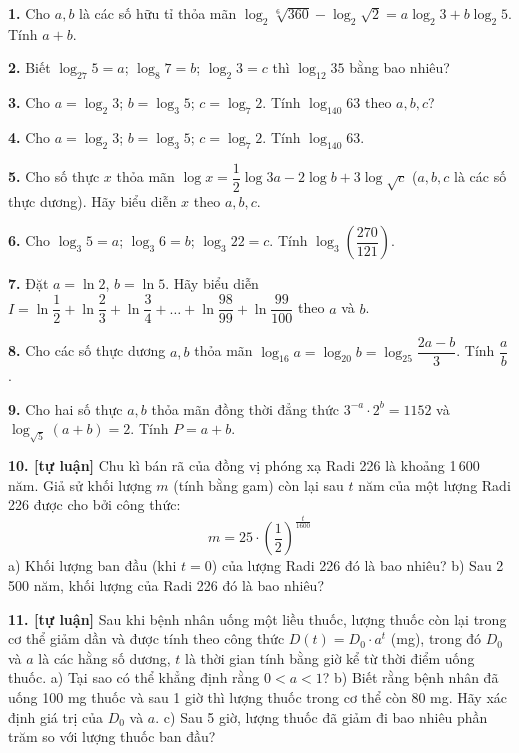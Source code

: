 \documentclass[12pt,a4paper]{extarticle}
\begin{document}
\noindent\textbf{1.} Cho $a, b$ là các số hữu tỉ thỏa mãn $\log_2 \sqrt[6]{360} - \log_2 \sqrt{2} = a\log_2 3 + b\log_2 5$. Tính $a + b$.
\vspace{0.4cm}

\noindent\textbf{2.} Biết $\log_{27} 5 = a$; $\log_8 7 = b$; $\log_2 3 = c$ thì $\log_{12} 35$ bằng bao nhiêu?
\vspace{0.4cm}

\noindent\textbf{3.} Cho $a = \log_2 3$; $b = \log_3 5$; $c = \log_7 2$. Tính $\log_{140} 63$ theo $a, b, c$?
\vspace{0.4cm}

\noindent\textbf{4.} Cho $a = \log_2 3$; $b = \log_3 5$; $c = \log_7 2$. Tính $\log_{140} 63$.
\vspace{0.4cm}

\noindent\textbf{5.} Cho số thực $x$ thỏa mãn $\log x = \dfrac{1}{2}\log 3a - 2\log b + 3\log \sqrt{c}$ ($a, b, c$ là các số thực dương). Hãy biểu diễn $x$ theo $a, b, c$.
\vspace{0.4cm}

\noindent\textbf{6.} Cho $\log_3 5 = a$; $\log_3 6 = b$; $\log_3 22 = c$. Tính $\log_3\left(\dfrac{270}{121}\right)$.
\vspace{0.4cm}

\noindent\textbf{7.} Đặt $a = \ln 2$, $b = \ln 5$. Hãy biểu diễn $I = \ln\dfrac{1}{2} + \ln\dfrac{2}{3} + \ln\dfrac{3}{4} + \dots + \ln\dfrac{98}{99} + \ln\dfrac{99}{100}$ theo $a$ và $b$.
\vspace{0.4cm}

\noindent\textbf{8.} Cho các số thực dương $a, b$ thỏa mãn $\log_{16} a = \log_{20} b = \log_{25} \dfrac{2a - b}{3}$. Tính $\dfrac{a}{b}$.
\vspace{0.4cm}

\noindent\textbf{9.} Cho hai số thực $a, b$ thỏa mãn đồng thời đẳng thức $3^{-a} \cdot 2^b = 1152$ và $\log_{\sqrt{5}}(a + b) = 2$.
\noindent Tính $P = a + b$.

\noindent\textbf{10. [tự luận]} Chu kì bán rã của đồng vị phóng xạ Radi 226 là khoảng 1\,600 năm. Giả sử khối lượng $m$ (tính bằng gam) còn lại sau $t$ năm của một lượng Radi 226 được cho bởi công thức:
\[ m = 25 \cdot \left(\frac{1}{2}\right)^{\frac{t}{1600}} \]
\noindent a) Khối lượng ban đầu (khi $t = 0$) của lượng Radi 226 đó là bao nhiêu?
\noindent b) Sau 2\,500 năm, khối lượng của Radi 226 đó là bao nhiêu?
\vspace{0.4cm}

\noindent\textbf{11. [tự luận]} Sau khi bệnh nhân uống một liều thuốc, lượng thuốc còn lại trong cơ thể giảm dần và được tính theo công thức $D(t) = D_0 \cdot a^t$ (mg), trong đó $D_0$ và $a$ là các hằng số dương, $t$ là thời gian tính bằng giờ kể từ thời điểm uống thuốc.
\noindent a) Tại sao có thể khẳng định rằng $0 < a < 1$?
\noindent b) Biết rằng bệnh nhân đã uống 100 mg thuốc và sau 1 giờ thì lượng thuốc trong cơ thể còn 80 mg. Hãy xác định giá trị của $D_0$ và $a$.
\noindent c) Sau 5 giờ, lượng thuốc đã giảm đi bao nhiêu phần trăm so với lượng thuốc ban đầu?
\vspace{0.4cm}
\end{document}
